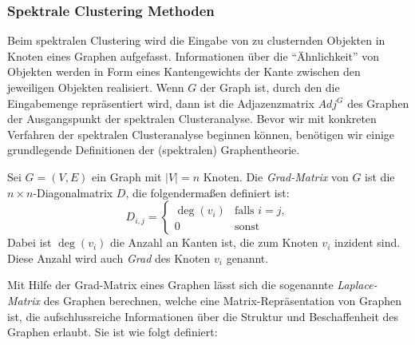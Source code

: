 \subsubsection{Spektrale Clustering Methoden}

Beim spektralen Clustering wird die Eingabe von zu clusternden Objekten in Knoten eines Graphen aufgefasst. Informationen
über die "`Ähnlichkeit"' von Objekten werden in Form eines Kantengewichts der Kante zwischen den jeweiligen Objekten
realisiert. Wenn $G$ der Graph ist, durch den die Eingabemenge repräsentiert wird, dann ist die Adjazenzmatrix $Adj^G$ des
Graphen der Ausgangspunkt der spektralen Clusteranalyse. Bevor wir mit konkreten Verfahren der spektralen Clusteranalyse
beginnen können, benötigen wir einige grundlegende Definitionen der (spektralen) Graphentheorie.

\begin{definition}
\label{def:degree-matrix}
	Sei $G = (V,E)$ ein Graph mit $\left| V \right| = n$ Knoten. Die \emph{Grad-Matrix} von $G$ ist die
	$n \times n$-Diagonalmatrix $D$, die folgendermaßen definiert ist:
	\[ D_{i,j} = 	\begin{cases}
						\deg(v_i) & \textrm{falls } i = j, \\
						0 & \textrm{sonst}
					\end{cases}
	\]
	Dabei ist $\deg(v_i)$ die Anzahl an Kanten ist, die zum Knoten $v_i$ inzident sind. Diese Anzahl wird auch
	\emph{Grad} des Knoten $v_i$ genannt.
\end{definition}

Mit Hilfe der Grad-Matrix eines Graphen lässt sich die sogenannte \emph{Laplace-Matrix} des Graphen berechnen, welche eine
Matrix-Repräsentation von Graphen ist, die aufschlussreiche Informationen über die Struktur und Beschaffenheit des Graphen
erlaubt. Sie ist wie folgt definiert:

